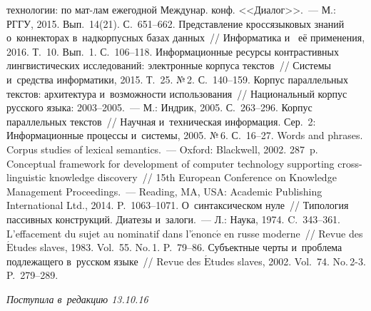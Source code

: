 \begin{multicols}{2}
{{\begin{thebibliography}{99}
технологии: по мат-лам ежегодной Междунар. конф. <<Диалог>>.~--- М.: РГГУ, 2015. 
Вып.~14(21). С.~651--662.
 Представление 
кроссязыковых знаний о~коннекторах в~надкорпусных базах данных~// Информатика и~
её применения, 2016. Т.~10. Вып.~1. С.~106--118.
 Информационные ресурсы контрастивных лингвистических 
исследований: электронные корпуса текстов~// Системы и~средства информатики, 2015. 
Т.~25. №\,2. С.~140--159.
 Корпус параллельных текстов: 
архитектура и~возможности использования~// Национальный корпус русского языка: 
2003--2005.~--- М.: Индрик, 2005. С.~263--296.
 Корпус параллельных текстов~// 
Научная и~техническая информация. Сер.~2: Информационные процессы и~сис\-те\-мы, 
2005. №\,6. С.~16--27.
 Words and phrases. Corpus studies of lexical semantics.~--- Oxford: Blackwell, 
2002. 287~p.
 Conceptual 
framework for development of computer technology supporting cross-linguistic knowledge 
discovery~// 15th European Conference on Knowledge Management Proceedings.~--- Reading, MA, USA: 
Academic Publishing International Ltd., 2014. P.~1063--1071.
 О~синтаксическом нуле~// Типология пассивных конструкций. 
Диатезы и~залоги.~--- Л.: Наука, 1974. C.~343--361.
 L'effacement du sujet au nominatif dans 
l'$\acute{\mbox{e}}$nonc$\acute{\mbox{e}}$ en russe moderne~// Revue des 
$\acute{\mbox{E}}$tudes slaves, 1983. Vol.~55. No.\,1. P.~79--86.
 Субъектные черты и~проблема подлежащего в~русском языке~// 
Revue des $\acute{\mbox{E}}$tudes slaves, 2002. Vol.~74. No.\,2-3. P.~279--289.
 \end{thebibliography}

 }
 }

\end{multicols}

\vspace*{-6pt}

\hfill{\small\textit{Поступила в~редакцию 13.10.16}}

\vspace*{8pt}



